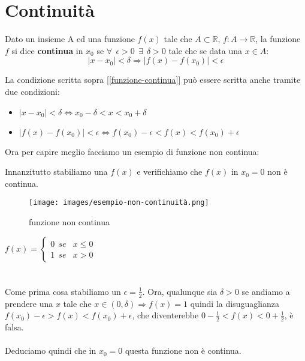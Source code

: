 \newpage
\section{Continuità}
\begin{definition}
    Dato un insieme A ed una funzione $f(x)$ tale che $A \subset \mathbb{R}$, $f: A \longrightarrow \mathbb{R}$, la funzione $f$ si dice \textbf{continua} in $x_0$ se $\forall \: \: \epsilon > 0 \: \: \exists \: \: \delta > 0$ tale che se data una $x \in A$:
    \begin{equation}\label{funzione-continua}
        |x - x_0| < \delta \Longrightarrow |f(x) - f(x_0)| < \epsilon
    \end{equation}
\end{definition}
La condizione scritta sopra [\ref{funzione-continua}] può essere scritta anche tramite due condizioni:
\begin{itemize}
    \item $|x - x_0| < \delta \Longleftrightarrow x_0 - \delta < x < x_0 + \delta$
    \item $|f(x) - f(x_0)| < \epsilon \Longleftrightarrow f(x_0) - \epsilon < f(x) < f(x_0) + \epsilon$
\end{itemize}
\begin{example}
Ora per capire meglio facciamo un esempio di funzione non continua:
\end{example}
Innanzitutto stabiliamo una $f(x)$ e verifichiamo che $f(x)$ in $x_0 = 0$ non è continua.\\ 
\begin{wrapfigure}{r}{8cm}
\vspace{-20pt}
    \centering
    \texttt{[image: images/esempio-non-continuità.png]}
    \caption{funzione non continua}
    \label{fig:funzione-non-continua}
\end{wrapfigure}

$
  f(x)=\begin{cases}
    0 \: \: se & x \leq 0\\
    1 \: \: se & x > 0
  \end{cases}
$\\ \\ \\
Come prima cosa stabiliamo un $\epsilon = \frac{1}{2}$. Ora, qualunque sia $\delta > 0$ se andiamo a prendere una $x$ tale che $x \in (0, \delta) \Longrightarrow f(x) = 1$ quindi la disuguaglianza $f(x_0) - \epsilon > f(x) < f(x_0) + \epsilon$, che diventerebbe $0 - \frac{1}{2} < f(x) < 0 + \frac{1}{2}$, è falsa. \\ \\
Deduciamo quindi che in $x_0 = 0$ questa funzione non è continua. \\ \\

